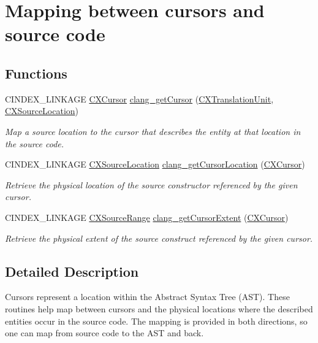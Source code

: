 \hypertarget{group__CINDEX__CURSOR__SOURCE}{}\section{Mapping between cursors and source code}
\label{group__CINDEX__CURSOR__SOURCE}
\subsection*{Functions}
\begin{DoxyCompactItemize}
\item 
C\+I\+N\+D\+E\+X\+\_\+\+L\+I\+N\+K\+A\+GE \mbox{\hyperlink{structCXCursor}{C\+X\+Cursor}} \mbox{\hyperlink{group__CINDEX__CURSOR__SOURCE_ga30a9972c7e099ab2735fa6c45e247ec8}{clang\+\_\+get\+Cursor}} (\mbox{\hyperlink{group__CINDEX_gacdb7815736ca709ce9a5e1ec2b7e16ac}{C\+X\+Translation\+Unit}}, \mbox{\hyperlink{structCXSourceLocation}{C\+X\+Source\+Location}})
\begin{DoxyCompactList}\small\item\em Map a source location to the cursor that describes the entity at that location in the source code. \end{DoxyCompactList}\item 
C\+I\+N\+D\+E\+X\+\_\+\+L\+I\+N\+K\+A\+GE \mbox{\hyperlink{structCXSourceLocation}{C\+X\+Source\+Location}} \mbox{\hyperlink{group__CINDEX__CURSOR__SOURCE_gada3d3cbd3a3e83ff64f992617318dfb1}{clang\+\_\+get\+Cursor\+Location}} (\mbox{\hyperlink{structCXCursor}{C\+X\+Cursor}})
\begin{DoxyCompactList}\small\item\em Retrieve the physical location of the source constructor referenced by the given cursor. \end{DoxyCompactList}\item 
C\+I\+N\+D\+E\+X\+\_\+\+L\+I\+N\+K\+A\+GE \mbox{\hyperlink{structCXSourceRange}{C\+X\+Source\+Range}} \mbox{\hyperlink{group__CINDEX__CURSOR__SOURCE_ga79f6544534ab73c78a8494c4c0bc2840}{clang\+\_\+get\+Cursor\+Extent}} (\mbox{\hyperlink{structCXCursor}{C\+X\+Cursor}})
\begin{DoxyCompactList}\small\item\em Retrieve the physical extent of the source construct referenced by the given cursor. \end{DoxyCompactList}\end{DoxyCompactItemize}


\subsection{Detailed Description}
Cursors represent a location within the Abstract Syntax Tree (A\+ST). These routines help map between cursors and the physical locations where the described entities occur in the source code. The mapping is provided in both directions, so one can map from source code to the A\+ST and back. 

